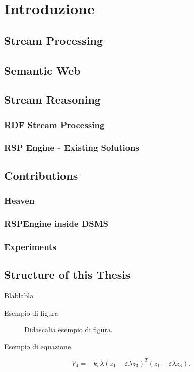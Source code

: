 \chapter{Introduzione}


\section{Stream Processing}
\section{Semantic Web}
\section{Stream Reasoning}
\subsection{RDF Stream Processing}
\subsection{RSP Engine - Existing Solutions}

\section{Contributions}
\subsection{Heaven}
\subsection{RSPEngine inside DSMS}
\subsection{Experiments}

\section{Structure of this Thesis}

Blablabla

Esempio di figura

\begin{figure}[ht]
\centerline{}
\caption{Didascalia esempio di figura.}
\label{fig:esempio}
\end{figure}

Esempio di equazione

\begin{equation}
\dot V_4= - k_v \lambda (z_1- \varepsilon \lambda z_3)^T(z_1-
\varepsilon \lambda z_3).
\end{equation}
